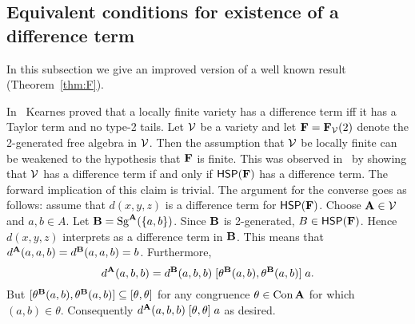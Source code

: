 \begin{comment}
\newcommand\neurel{\ensuremath{\stackrel{n}{\sim}}}
We write $\alpha \neurel \beta$ and say that $\alpha$ and $\beta$ are
\defn{neutrally related} if the interval $\lb \alpha \meet \beta, \alpha
\join \beta\rb$ is neutral. 

\begin{lem}[\protect{\cite[Lemma 3.6]{MR1358491}}]
  \label{lem:mod-sd-meet}
Assume that $\sV$ has a difference term and $\bA \in \sV$. Then
\begin{enumerate}[(i)]
\item $\neurel$ is a congruence of $\Con\bA$.
\item If $\delta \leq \alpha, \beta$, then $\alpha \neurel \beta$
  iff $\alpha/\delta \neurel \beta/\delta$ in $\Con\bA/\delta$.
\item $\neurel$-classes are convex, meet-semidistributive sublattices.
\item $\Con\bA/\neurel$ is modular.
\end{enumerate}
Hence $\Con\bA$ is a subdirect product of of a modular lattice and a
meet-semidistributive lattice.
\end{lem}

\end{comment}

\subsection{Equivalent conditions for existence of a difference term}
In this subsection we give an improved version of a well known result
(Theorem~\ref{thm:F}).  %

In~\cite{MR1358491} Kearnes proved that
a locally finite variety has a difference term
iff it has a Taylor term and no type-2 tails.
Let $\mathcal{V}$ be a variety and let $\mathbf{F} = \mathbf{F}_{\mathcal{V}}(2)$ denote the 2-generated
free algebra in $\mathcal{V}$.
Then the assumption that $\mathcal{V}$ be locally finite can be weakened
to the hypothesis that $\mathbf{F}$ is finite. This was observed in~\cite{MR1358491} 
by showing that $\mathcal{V}$ has a difference term if and only if $\mathsf{H} \mathsf{S} \mathsf{P}(\mathbf{F})$
has a difference term.
The forward implication of this claim is trivial. 
The argument for the converse goes as follows:
assume that $d(x, y, z)$ is a difference term for $\mathsf{H} \mathsf{S} \mathsf{P}(\mathbf{F})$.
Choose $\mathbf{A} \in \mathcal{V}$ and $a, b \in A$. Let $\mathbf{B} = \operatorname{Sg}^{\mathbf{A}} (\{a, b\})$.
Since $\mathbf{B}$ is 2-generated, $B \in \mathsf{H} \mathsf{S} \mathsf{P} (\mathbf{F})$.
Hence $d(x, y, z)$ interprets as a difference term in $\mathbf{B}$. This means that
$d^{\mathbf{A}} (a, a, b) = d^{\mathbf{B}} (a, a, b) = b$.
Furthermore,
\[
d^{\mathbf{A}} (a, b, b) = d^{\mathbf{B}} (a, b, b) \mathrel{[\theta^{\mathbf{B}} (a, b), \theta^{\mathbf{B}} (a, b)]} a.
\]
But $[\theta^{\mathbf{B}} (a, b), \theta^{\mathbf{B}} (a,b)]\subseteq [\theta, \theta]$ for any congruence
$\theta \in \operatorname{Con} \mathbf{A}$ for which $(a, b) \in \theta$. Consequently
$d^{\mathbf{A}} (a, b, b) \mathrel{[\theta, \theta]} a$ as desired.


